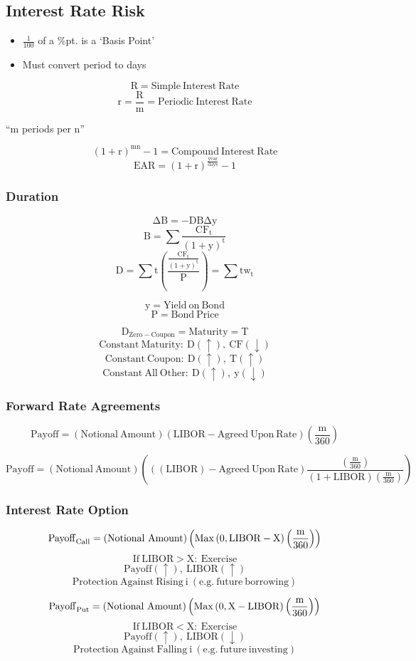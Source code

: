 \documentclass[11pt, english]{article}
\begin{document}
\newpage

	\subsection{Interest Rate Risk}

	\begin{itemize}
	\setlength\itemsep{0pt}
		\item $\frac{1}{100}$ of a \%pt. is a `Basis Point'
		\item Must convert period to days
	\end{itemize}

	$$\mathrm{R=Simple\ Interest\ Rate}$$
	$$\mathrm{r=\frac{R}{m}=Periodic\ Interest\ Rate}$$
	\begin{center}``m periods per n''\end{center}
	$$\mathrm{\left(1+r\right)^{mn}-1=Compound\ Interest\ Rate}$$
	$$\mathrm{EAR=(1+r)^\frac{year}{days}-1}$$

		\subsubsection{Duration}

	$$\mathrm{\Delta B=-DB\Delta y}$$
	$$\mathrm{B=\sum\frac{{CF}_t}{\left(1+y\right)^t}}$$
	$$\mathrm{D=\sum t\left(\frac{\frac{CF_t}{(1+y)^t}}{P}\right)=\sum tw_t}$$

	$$\mathrm{y=Yield\ on\ Bond}$$
	$$\mathrm{P=Bond\ Price}$$

	$$\mathrm{D_{Zero-Coupon}=Maturity=T}$$
	$$\mathrm{Constant\ Maturity:\ D(\uparrow),\ CF(\downarrow)}$$
	$$\mathrm{Constant\ Coupon:\ D(\uparrow),\ T(\uparrow)}$$
	$$\mathrm{Constant\ All\ Other:\ D(\uparrow),\ y(\downarrow)}$$

		\subsubsection{Forward Rate Agreements}

	$$\mathrm{Payoff=\left(Notional\ Amount\right)\left(LIBOR-Agreed\ Upon\ Rate\right)\left(\frac{m}{360}\right)}$$

	$$\mathrm{Payoff=\left(Notional\ Amount\right)\left((\left(LIBOR\right)-Agreed\ Upon\ Rate)\frac{\left(\frac{m}{360}\right)}{\left(1+LIBOR\right)\left(\frac{m}{360}\right)}\right)}$$

		\subsubsection{Interest Rate Option}

	$$\mathrm{{\rm Payoff}_{Call}=\left(Notional\ Amount\right)\left(Max\left(0,LIBOR-X\right)\left(\frac{m}{360}\right)\right)}$$
	$$\mathrm{If\ LIBOR>X:\ Exercise}$$
	$$\mathrm{Payoff(\uparrow),\ LIBOR(\uparrow)}$$
	$$\mathrm{Protection\ Against\ Rising\ i\ (e.g.\ future\ borrowing)}$$

	$$\mathrm{{\rm Payoff}_{Put}=\left(Notional\ Amount\right)\left(Max\left(0,X-LIBOR\right)\left(\frac{m}{360}\right)\right)}$$                               
        $$\mathrm{If\ LIBOR<X:\ Exercise}$$
        $$\mathrm{Payoff(\uparrow),\ LIBOR(\downarrow)}$$
        $$\mathrm{Protection\ Against\ Falling\ i\ (e.g.\ future\ investing)}$$
\end{document}
